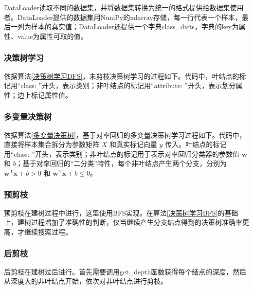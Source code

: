\documentclass{ctexart}
\begin{document}
	DataLoader读取不同的数据集，并将数据集转换为统一的格式提供给数据集使用者。DataLoader提供的数据集用NumPy的ndarray存储，每一行代表一个样本，最后一列为样本的真实值；DataLoader还提供一个字典class\_dicts，字典的key为属性、value为属性可取的值。
	
	
	
	\subsubsection{决策树学习}
	
	依据算法\ref{决策树学习DFS}，未剪枝决策树学习的过程如下。代码中，叶结点的标记用“class: ”开头，表示类别；非叶结点的标记用“attribute: ”开头，表示划分属性；边上标记属性值。
	
	
	\subsubsection{多变量决策树}
	
	依据算法\ref{多变量决策树}，基于对率回归的多变量决策树学习过程如下。代码中，直接将样本集合拆分为参数矩阵 $X$ 和真实标记向量 $y$ 传入。叶结点的标记用“class: ”开头，表示类别；非叶结点的标记用于表示对率回归分类器的参数值 $\bm{w}$ 和 $b$；基于对率回归的“二分类”特性，每个非叶结点产生两个分支，分别为 $\bm{w}^\mathrm{T}\bm{x}+b>0$ 和 $\bm{w}^\mathrm{T}\bm{x}+b\leqslant0$。
	
	
	
	\subsubsection{预剪枝}
	
	预剪枝在建树过程中进行，这里使用BFS实现。在算法\ref{决策树学习BFS}的基础上，建树过程增加了准确性的判断，仅当继续产生分支结点得到的决策树准确率更高，才继续搜索过程。
	
	
	\subsubsection{后剪枝}
	
	后剪枝在建树过后进行。首先需要调用get\_depth函数获得每个结点的深度，然后从深度大的非叶结点开始，依次对非叶结点进行剪枝。
	
	
	
\end{document}
